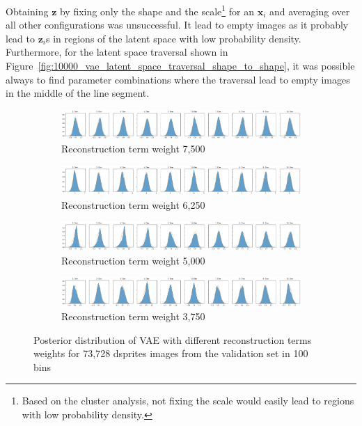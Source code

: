Obtaining $\bm{z}$ by fixing only the shape and the scale\footnote{Based on the cluster analysis, not fixing the scale would easily lead to regions with low probability density.} for an $\bm{x}_i$ and averaging over all other configurations was unsuccessful.
It lead to empty images as it probably lead to $\bm{z}_i$s in regions of the latent space with low probability density.
Furthermore, for the latent space traversal shown in Figure~\ref{fig:10000_vae_latent_space_traversal_shape_to_shape}, it was possible always to find parameter combinations where the traversal lead to empty images in the middle of the line segment.

\begin{figure}
    \centering
    \begin{subfigure}{\textwidth}
        \centering
        \includegraphics[width=\textwidth]{images/latent_space_entanglement/vae_dsprites_lf_7500_dist.png}
        \caption{Reconstruction term weight 7,500}
    \end{subfigure}
    \begin{subfigure}{\textwidth}
        \centering
        \includegraphics[width=\textwidth]{images/latent_space_entanglement/vae_dsprites_lf_6250_dist.png}
        \caption{Reconstruction term weight 6,250}
    \end{subfigure}
    \begin{subfigure}{\textwidth}
        \centering
        \includegraphics[width=\textwidth]{images/latent_space_entanglement/vae_dsprites_lf_5000_dist.png}
        \caption{Reconstruction term weight 5,000}
    \end{subfigure}
    \begin{subfigure}{\textwidth}
        \centering
        \includegraphics[width=\textwidth]{images/latent_space_entanglement/vae_dsprites_lf_3750_dist.png}
        \caption{Reconstruction term weight 3,750}
    \end{subfigure}
    \caption[VAE Latent Space Distribution - Different Reconstruction Term Weights]{Posterior distribution of VAE with different reconstruction terms weights for 73,728 dsprites images from the validation set in 100 bins}
    \label{fig:7500_5000_vae_latent_space_distribution_scales_and_shapes}
\end{figure}

